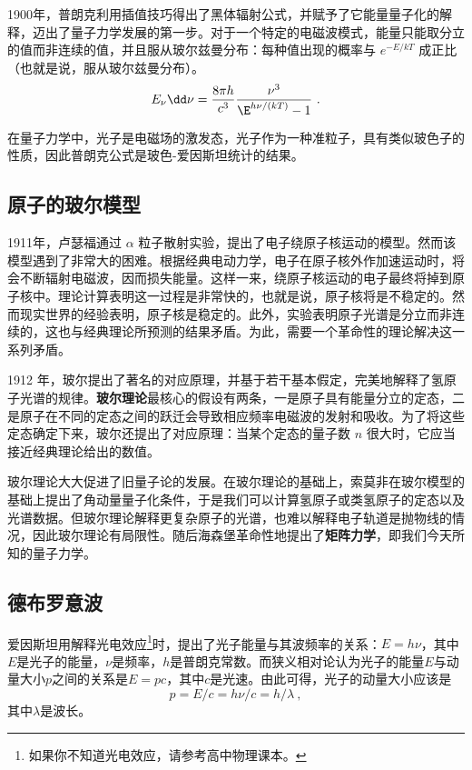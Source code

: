 1900年，普朗克利用插值技巧得出了黑体辐射公式，并赋予了它能量量子化的解释，迈出了量子力学发展的第一步。对于一个特定的电磁波模式，能量只能取分立的值而非连续的值，并且服从玻尔兹曼分布：每种值出现的概率与 $e^{-E/kT}$ 成正比（也就是说，服从玻尔兹曼分布）。
\begin{equation}
E_\nu \dd \nu=\frac{8\pi h}{c^3}\frac{\nu^3}{\E^{h\nu/(k T)} - 1}~.
\end{equation}

在量子力学中，光子是电磁场的激发态，光子作为一种准粒子，具有类似玻色子的性质，因此普朗克公式是玻色-爱因斯坦统计的结果。

\subsection{原子的玻尔模型}
1911年，卢瑟福通过 $\alpha$ 粒子散射实验，提出了电子绕原子核运动的模型。然而该模型遇到了非常大的困难。根据经典电动力学，电子在原子核外作加速运动时，将会不断辐射电磁波，因而损失能量。这样一来，绕原子核运动的电子最终将掉到原子核中。理论计算表明这一过程是非常快的，也就是说，原子核将是不稳定的。然而现实世界的经验表明，原子核是稳定的。此外，实验表明原子光谱是分立而非连续的，这也与经典理论所预测的结果矛盾。为此，需要一个革命性的理论解决这一系列矛盾。

1912 年，玻尔提出了著名的对应原理，并基于若干基本假定，完美地解释了氢原子光谱的规律。\textbf{玻尔理论}最核心的假设有两条，一是原子具有能量分立的定态，二是原子在不同的定态之间的跃迁会导致相应频率电磁波的发射和吸收。为了将这些定态确定下来，玻尔还提出了对应原理：当某个定态的量子数 $n$ 很大时，它应当接近经典理论给出的数值。

玻尔理论大大促进了旧量子论的发展。在玻尔理论的基础上，索莫非在玻尔模型的基础上提出了角动量量子化条件，于是我们可以计算氢原子或类氢原子的定态以及光谱数据。但玻尔理论解释更复杂原子的光谱，也难以解释电子轨道是抛物线的情况，因此玻尔理论有局限性。随后海森堡革命性地提出了\textbf{矩阵力学}，即我们今天所知的量子力学。

\subsection{德布罗意波}
爱因斯坦用解释光电效应\footnote{如果你不知道光电效应，请参考高中物理课本。%
}时，提出了光子能量与其波频率的关系：$E=h\nu$，其中$E$是光子的能量，$\nu$是频率，$h$是普朗克常数。而狭义相对论认为光子的能量$E$与动量大小$p$之间的关系是$E=pc$，其中$c$是光速。由此可得，光子的动量大小应该是
\begin{equation}
p=E/c=h\nu/c=h/\lambda~,
\end{equation}
其中$\lambda$是波长。

